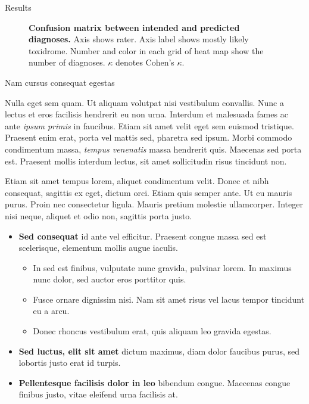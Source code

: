 \documentclass[final]{beamer}
\newlength{\colwidth}
\begin{document}
\begin{frame}[t]
\begin{columns}[t]
\begin{column}{\colwidth}
\begin{block}{Results}
\begin{figure}
\begin{minipage}{0.35\colwidth}
      \caption{\textbf{Confusion matrix between intended and predicted diagnoses.} Axis shows rater. Axis label shows mostly likely toxidrome. Number and color in each grid of heat map show the number of diagnoses. $\kappa$ denotes Cohen's $\kappa$.}
      \end{minipage}
     
    \end{figure}

  \end{block}

  \begin{block}{Nam cursus consequat egestas}

    Nulla eget sem quam. Ut aliquam volutpat nisi vestibulum convallis. Nunc a
    lectus et eros facilisis hendrerit eu non urna. Interdum et malesuada fames
    ac ante \textit{ipsum primis} in faucibus. Etiam sit amet velit eget sem
    euismod tristique. Praesent enim erat, porta vel mattis sed, pharetra sed
    ipsum. Morbi commodo condimentum massa, \textit{tempus venenatis} massa
    hendrerit quis. Maecenas sed porta est. Praesent mollis interdum lectus,
    sit amet sollicitudin risus tincidunt non.

    Etiam sit amet tempus lorem, aliquet condimentum velit. Donec et nibh
    consequat, sagittis ex eget, dictum orci. Etiam quis semper ante. Ut eu
    mauris purus. Proin nec consectetur ligula. Mauris pretium molestie
    ullamcorper. Integer nisi neque, aliquet et odio non, sagittis porta justo.

    \begin{itemize}
      \item \textbf{Sed consequat} id ante vel efficitur. Praesent congue massa
        sed est scelerisque, elementum mollis augue iaculis.
        \begin{itemize}
          \item In sed est finibus, vulputate
            nunc gravida, pulvinar lorem. In maximus nunc dolor, sed auctor eros
            porttitor quis.
          \item Fusce ornare dignissim nisi. Nam sit amet risus vel lacus
            tempor tincidunt eu a arcu.
          \item Donec rhoncus vestibulum erat, quis aliquam leo
            gravida egestas.
        \end{itemize}
      \item \textbf{Sed luctus, elit sit amet} dictum maximus, diam dolor
        faucibus purus, sed lobortis justo erat id turpis.
      \item \textbf{Pellentesque facilisis dolor in leo} bibendum congue.
        Maecenas congue finibus justo, vitae eleifend urna facilisis at.
    \end{itemize}


\end{block}
\end{column}
\end{columns}
\end{frame}
\end{document}
